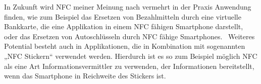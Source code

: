 \begin{multicols}{3}
In Zukunft wird NFC meiner Meinung nach vermehrt in der Praxis Anwendung finden, wie zum Beispiel das Ersetzen von Bezahlmitteln durch eine virtuelle Bankkarte, die eine Applikation in einem NFC fähigen Smartphone darstellt, oder das Ersetzen von Autoschlüsseln durch NFC fähige Smartphones.~\cite{nfc.2} Weiteres Potential besteht auch in Applikationen, die in Kombination mit sogenannten „NFC Stickern“ verwendet werden. Hierdurch ist es so zum Beispiel möglich NFC als eine Art Informationsvermittler zu verwenden, der Informationen bereitstellt, wenn das Smartphone in Reichweite des Stickers ist.~\cite{nfc.15}

\printbibliography[segment=12,heading=subbibliography]

\end{multicols}
\newpage
